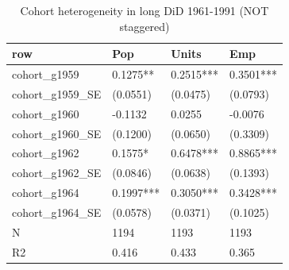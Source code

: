 \begin{table}

\caption{Cohort heterogeneity in long DiD 1961-1991 (NOT staggered)}
\centering
\begin{tabular}[t]{llll}
\toprule
row & Pop & Units & Emp\\
\midrule
cohort\_g1959 & 0.1275** & 0.2515*** & 0.3501***\\
cohort\_g1959\_SE & (0.0551) & (0.0475) & (0.0793)\\
cohort\_g1960 & -0.1132 & 0.0255 & -0.0076\\
cohort\_g1960\_SE & (0.1200) & (0.0650) & (0.3309)\\
cohort\_g1962 & 0.1575* & 0.6478*** & 0.8865***\\
\addlinespace
cohort\_g1962\_SE & (0.0846) & (0.0638) & (0.1393)\\
cohort\_g1964 & 0.1997*** & 0.3050*** & 0.3428***\\
cohort\_g1964\_SE & (0.0578) & (0.0371) & (0.1025)\\
N & 1194 & 1193 & 1193\\
R2 & 0.416 & 0.433 & 0.365\\
\bottomrule
\end{tabular}
\end{table}
